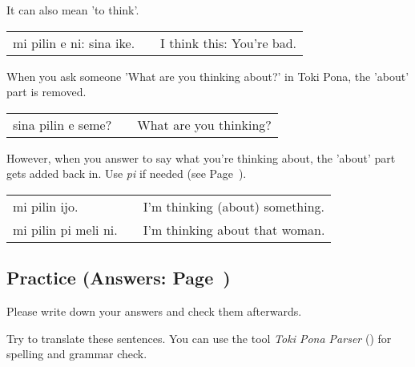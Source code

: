 {It can also mean 'to think'.

\begin{supertabular}{p{5,5cm}|ll}
mi pilin e ni: sina ike. && I think this: You're bad. \\ 
\end{supertabular} 

When you ask someone 'What are you thinking about?' in Toki Pona, the 'about' part is removed. 

\begin{supertabular}{p{5,5cm}|ll}
sina pilin e seme? && What are you thinking? \\
\end{supertabular} 

However, when you answer to say what you're thinking about, the 'about' part gets added back in. 
Use \textit{pi} if needed (see Page~\pageref{'mistakes_with_pi'}).

\begin{supertabular}{p{5,5cm}|ll}
mi pilin ijo. && I'm thinking (about) something. \\
mi pilin pi meli ni. && I'm thinking about that woman. \\
\end{supertabular} 
% 
\newpage
%
\subsection*{Practice (Answers: Page~\pageref{'conjunctions_temperature'})}
%
Please write down your answers and check them afterwards. 

Try to translate these sentences. 
You can use the tool \textit{Toki Pona Parser} (\cite{www:rowa:02}) for spelling and grammar check. 


}
